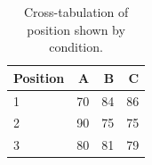 \begin{table}[H]
\caption{Cross-tabulation of position shown by condition.}
\label{tab:position:bycond}
\centering
\begin{tabular}{lrrr}
\toprule
Position & A & B & C \\
\midrule
1 & 70 & 84 & 86 \\
2 & 90 & 75 & 75 \\
3 & 80 & 81 & 79 \\
\bottomrule
\end{tabular}
\end{table}
